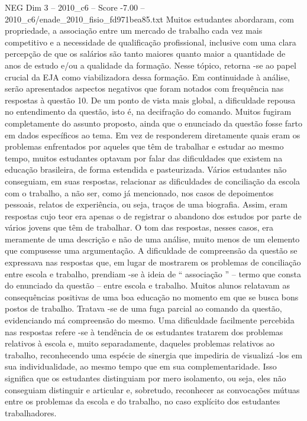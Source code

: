 \begin{textsample}{NEG Dim 3 – 2010\_c6 – Score -7.00 – 2010\_c6/enade\_2010\_fisio\_fd971bea85.txt}
Muitos estudantes abordaram, com propriedade, a associação entre um mercado de trabalho cada vez mais competitivo e a necessidade de qualificação profissional, inclusive com uma clara percepção de que os salários são tanto maiores quanto maior a quantidade de anos de estudo e/ou a qualidade da formação.
Nesse tópico, retorna -se ao papel crucial da EJA como viabilizadora dessa formação.
Em continuidade à análise, serão apresentados aspectos negativos que foram notados com frequência nas respostas à questão 10.
De um ponto de vista mais global, a dificuldade repousa no entendimento da questão, isto é, na decifração do comando.
Muitos fugiram completamente do assunto proposto, ainda que o enunciado da questão fosse farto em dados específicos ao tema.
Em vez de responderem diretamente quais eram os problemas enfrentados por aqueles que têm de trabalhar e estudar ao mesmo tempo, muitos estudantes optavam por falar das dificuldades que existem na educação brasileira, de forma estendida e pasteurizada.
Vários estudantes não conseguiam, em suas respostas, relacionar as dificuldades de conciliação da escola com o trabalho, a não ser, como já mencionado, nos casos de depoimentos pessoais, relatos de experiência, ou seja, traços de uma biografia.
Assim, eram respostas cujo teor era apenas o de registrar o abandono dos estudos por parte de vários jovens que têm de trabalhar.
O tom das respostas, nesses casos, era meramente de uma descrição e não de uma análise, muito menos de um elemento que compusesse uma argumentação.
A dificuldade de compreensão da questão se expressava nas respostas que, em lugar de mostrarem os problemas de conciliação entre escola e trabalho, prendiam -se à ideia de “ associação ” – termo que consta do enunciado da questão – entre escola e trabalho.
Muitos alunos relatavam as consequências positivas de uma boa educação no momento em que se busca bons postos de trabalho.
Tratava -se de uma fuga parcial ao comando da questão, evidenciando má compreensão do mesmo.
Uma dificuldade facilmente percebida nas respostas refere -se à tendência de os estudantes tratarem dos problemas relativos à escola e, muito separadamente, daqueles problemas relativos ao trabalho, reconhecendo uma espécie de sinergia que impediria de visualizá -los em sua individualidade, ao mesmo tempo que em sua complementaridade.
Isso significa que os estudantes distinguiam por mero isolamento, ou seja, eles não conseguiam distinguir e articular e, sobretudo, reconhecer as convocações mútuas entre os problemas da escola e do trabalho, no caso explícito dos estudantes trabalhadores.

\end{textsample}
